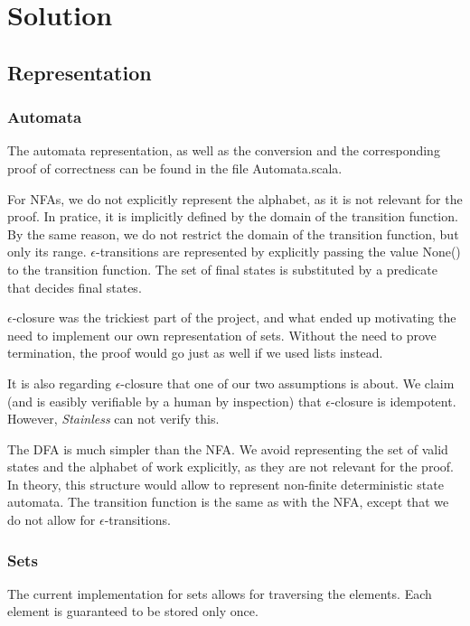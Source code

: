 \documentclass[12pt, a4paper]{article}
\theoremstyle{break}
\begin{document}
\section{Solution}

\subsection{Representation}

\subsubsection{Automata}

The automata representation, as well as the conversion and the corresponding
proof of correctness can be found in the file Automata.scala.

For NFAs, we do not explicitly represent the alphabet, as it is not relevant for
the proof. In pratice, it is implicitly defined by the domain of the transition
function. By the same reason, we do not restrict the domain of the transition
function, but only its range. $\epsilon$-transitions are represented by
explicitly passing the value None() to the transition function. The set of final
states is substituted by a predicate that decides final states.

$\epsilon$-closure was the trickiest part of the project, and what ended up
motivating the need to implement our own representation of sets. Without the
need to prove termination, the proof would go just as well if we used lists
instead.

It is also regarding $\epsilon$-closure that one of our two assumptions
is about. We claim (and is easibly verifiable by a human by inspection) that
$\epsilon$-closure is idempotent. However, \textit{Stainless} can not verify this.

The DFA is much simpler than the NFA. We avoid representing the set of valid
states and the alphabet of work explicitly, as they are not relevant for the
proof. In theory, this structure would allow to represent non-finite
deterministic state automata. The transition function is the same as with the
NFA, except that we do not allow for $\epsilon$-transitions.


\subsubsection{Sets}

The current implementation for sets allows for traversing the elements. Each
element is guaranteed to be stored only once.
\end{document}
